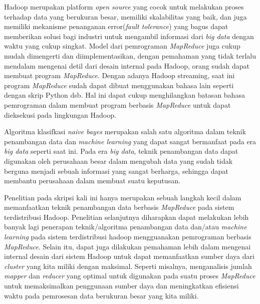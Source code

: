 Hadoop merupakan platform \textit{open source} yang cocok untuk melakukan proses terhadap data yang berukuran besar, memiliki skalabilitas yang baik, dan juga memiliki mekanisme penanganan error(\textit{fault tolerance}) yang bagus dapat memberikan solusi bagi industri untuk mengambil informasi dari \textit{big data} dengan waktu yang cukup singkat. Model dari pemrograman \textit{MapReduce} juga cukup mudah dimengerti dan diimplementasikan, dengan pemahaman yang tidak terlalu mendalam mengenai detil dari desain internal pada Hadoop, orang sudah dapat membuat program \textit{MapReduce}. Dengan adanya Hadoop streaming, saat ini program \textit{MapReduce} sudah dapat dibuat menggunakan bahasa lain seperti dengan skrip Python dsb. Hal ini dapat cukup menghilangkan batasan bahasa pemrograman dalam membuat program berbasis \textit{MapReduce} untuk dapat dieksekusi pada lingkungan Hadoop.

Algoritma klasifkasi \textit{naive bayes} merupakan salah satu algoritma dalam teknik penambangan data dan \textit{machine learning} yang dapat sangat bermanfaat pada era \textit{big data} seperti saat ini. Pada era \textit{big data}, teknik penambangan data dapat digunakan oleh perusahaan besar dalam mengubah data yang sudah tidak berguna menjadi sebuah informasi yang sangat berharga, sehingga dapat membantu perusahaan dalam membuat suatu keputusan.

Penelitian pada skripsi kali ini hanya merupakan sebuah langkah kecil dalam memanfaatkan teknik penambangan data berbasis \textit{MapReduce} pada sistem terdistribusi Hadoop. Penelitian selanjutnya diharapkan dapat melakukan lebih banyak lagi penerapan teknik/algoritma penambangan data dan/atau \textit{machine learning} pada sistem terdistribusi hadoop mengguanakan pemrograman berbasis \textit{MapReduce}. Selain itu, dapat juga dilakukan pemahaman lebih dalam mengenai internal desain dari sistem Hadoop untuk dapat memanfaatkan sumber daya dari \textit{cluster} yang kita miliki dengan maksimal. Seperti misalnya, menganalisis jumlah \textit{mapper} dan \textit{reducer} yang optimal untuk digunakan pada suatu proses \textit{MapReduce} untuk memaksimalkan penggunaan sumber daya dan meningkatkan efisiensi waktu pada pemrosesan data berukuran besar yang kita miliki.

